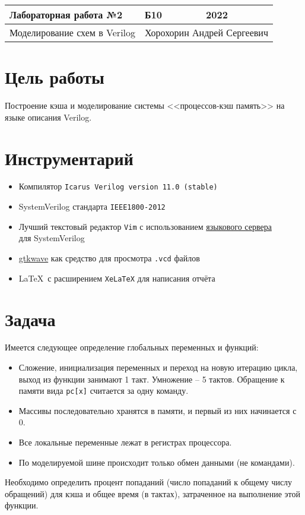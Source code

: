 \documentclass[14pt, russian, onesize]{extreport}
\begin{document}
\begin{tabular}{|p{8cm}|p{3cm}|p{3cm}|}
    \hline
    Лабораторная работа №2 & Б10 & 2022\\
    \hline
    Моделирование схем в Verilog  & \multicolumn{2}{|c|}{Хорохорин Андрей Сергеевич}\\
    \hline
\end{tabular}

\section*{ Цель работы }
Построение кэша и моделирование системы <<процессов-кэш память>> на языке описания
Verilog.

\section*{ Инструментарий }
\begin{itemize}
    \item Компилятор \texttt{Icarus Verilog version 11.0 (stable)}
    \item SystemVerilog стандарта \texttt{IEEE1800-2012}
    \item Лучший текстовый редактор \texttt{Vim} с использованием
        \href{https://github.com/dalance/svls?ysclid=lap6k2eu7x964048881}{\color{blue}языкового сервера} \\
        для SystemVerilog
    \item \href{https://github.com/gtkwave/gtkwave?ysclid=lap6sdyzr9924824009}{\color{blue}gtkwave} как средство для просмотра \texttt{.vcd} файлов 
    \item \LaTeX~с расширением \texttt{XeLaTeX} для написания отчёта
\end{itemize}

\section*{ Задача }
Имеется следующее определение глобальных переменных и функций: 
\begin{listing}[H]
\end{listing}
\begin{itemize}
    \item Сложение, инициализация переменных и переход на новую итерацию цикла, выход из функции занимают 1 такт.
      Умножение – 5 тактов. Обращение к памяти вида \texttt{pc[x]} считается за одну команду.
    \item Массивы последовательно хранятся в памяти, и первый из них начинается с 0.
    \item Все локальные переменные лежат в регистрах процессора.
    \item По моделируемой шине происходит только обмен данными (не командами).
\end{itemize}
Необходимо определить процент попаданий 
(число попаданий к общему числу обращений) для кэша и общее время (в тактах),
затраченное на выполнение этой функции.
\end{document}
